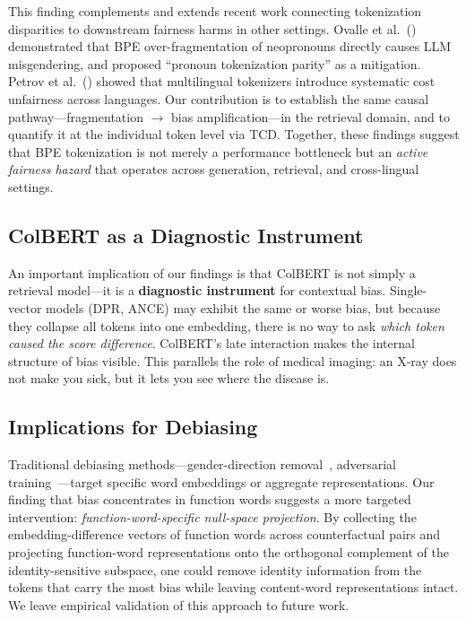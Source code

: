 \documentclass[sigconf,review,anonymous]{acmart}
\begin{document}
This finding complements and extends recent work connecting tokenization disparities to downstream fairness harms in other settings. Ovalle et al.~(\citeyear{ovalle2024}) demonstrated that BPE over-fragmentation of neopronouns directly causes LLM misgendering, and proposed ``pronoun tokenization parity'' as a mitigation. Petrov et al.~(\citeyear{petrov2023}) showed that multilingual tokenizers introduce systematic cost unfairness across languages. Our contribution is to establish the same causal pathway---fragmentation $\to$ bias amplification---in the retrieval domain, and to quantify it at the individual token level via TCD. Together, these findings suggest that BPE tokenization is not merely a performance bottleneck but an \emph{active fairness hazard} that operates across generation, retrieval, and cross-lingual settings.

\subsection{ColBERT as a Diagnostic Instrument}

An important implication of our findings is that ColBERT is not simply a retrieval model---it is a \textbf{diagnostic instrument} for contextual bias. Single-vector models (DPR, ANCE) may exhibit the same or worse bias, but because they collapse all tokens into one embedding, there is no way to ask \emph{which token caused the score difference}. ColBERT's late interaction makes the internal structure of bias visible. This parallels the role of medical imaging: an X-ray does not make you sick, but it lets you see where the disease is.

\subsection{Implications for Debiasing}

Traditional debiasing methods---gender-direction removal~\cite{bolukbasi2016}, adversarial training~\cite{rekabsaz2021}---target specific word embeddings or aggregate representations. Our finding that bias concentrates in function words suggests a more targeted intervention: \emph{function-word-specific null-space projection}. By collecting the embedding-difference vectors of function words across counterfactual pairs and projecting function-word representations onto the orthogonal complement of the identity-sensitive subspace, one could remove identity information from the tokens that carry the most bias while leaving content-word representations intact. We leave empirical validation of this approach to future work.
\end{document}

